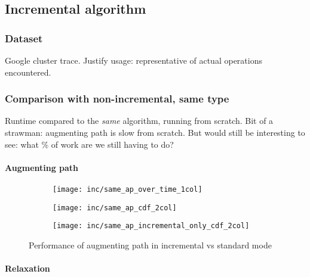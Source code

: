 \subsection{Incremental algorithm} \label{sec:eval-incremental}

\subsubsection{Dataset}

Google cluster trace. Justify usage: representative of actual operations encountered.

\subsubsection{Comparison with non-incremental, same type}

Runtime compared to the {\it same} algorithm, running from scratch. Bit of a strawman: augmenting path is slow from scratch. But would still be interesting to see: what \% of work are we still having to do?

\paragraph{Augmenting path}

\begin{figure}
    \begin{widepage}
    \begin{subfigure}[c]{\textwidth}
        \texttt{[image: inc/same\_ap\_over\_time\_1col]}
    \end{subfigure}
    \begin{subfigure}[c]{0.5\textwidth}
        \texttt{[image: inc/same\_ap\_cdf\_2col]}
    \end{subfigure}
   \begin{subfigure}[c]{0.5\textwidth}
       \texttt{[image: inc/same\_ap\_incremental\_only\_cdf\_2col]}
    \end{subfigure}
    \end{widepage}
    \caption{Performance of augmenting path in incremental vs standard mode}
    \label{fig:inc-same-ap}
\end{figure}

\paragraph{Relaxation}

